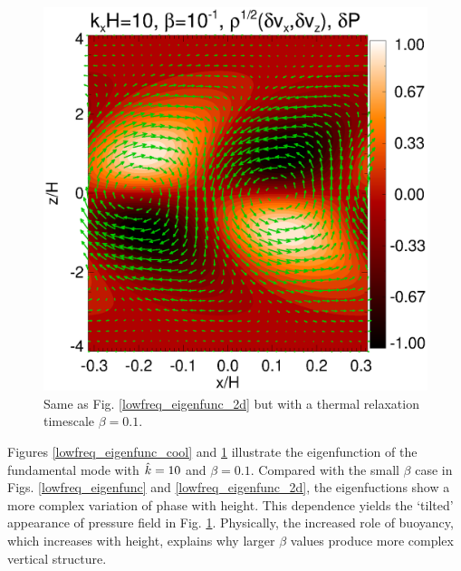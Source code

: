 \begin{figure}
  \includegraphics[width=\linewidth]{figures/result2d_cool}
  \caption{Same as  Fig. \ref{lowfreq_eigenfunc_2d} but with a thermal
    relaxation timescale $\beta=0.1$. 
    \label{lowfreq_eigenfunc_2d_cool}
  }
\end{figure}

Figures \ref{lowfreq_eigenfunc_cool} and \ref{lowfreq_eigenfunc_2d_cool}
illustrate the eigenfunction of the fundamental mode with $\hat{k}=10$ and
$\beta=0.1$. Compared with the small $\beta$ case in 
Figs. \ref{lowfreq_eigenfunc} and \ref{lowfreq_eigenfunc_2d}, the eigenfuctions 
show a more complex variation of phase with height.  This dependence yields 
the `tilted' appearance of pressure field in  Fig. \ref{lowfreq_eigenfunc_2d_cool}.
Physically, the increased role of buoyancy, which increases with height, explains 
why larger $\beta$ values produce more complex vertical structure. 

